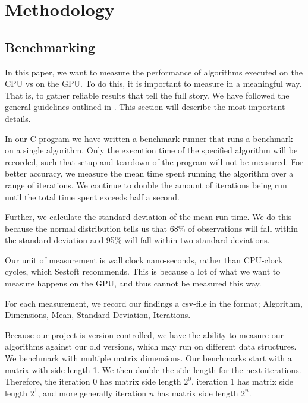 
\section{Methodology}
\label{sect:methodology}

\subsection{Benchmarking} \label{subsect:benchmark}
In this paper, we want to measure the performance of algorithms executed on the CPU vs on the GPU. To do this, it is important to measure in a meaningful way. That is, to gather reliable results that tell the full story. We have followed the general guidelines outlined in \cite[Sect. 3]{sestoft:benchmarks}. This section will describe the most important details. 

In our C-program we have written a benchmark runner that runs a benchmark on a single algorithm. Only the execution time of the specified algorithm will be recorded, such that setup and teardown of the program will not be measured. For better accuracy, we measure the mean time spent running the algorithm over a range of iterations. We continue to double the amount of iterations being run until the total time spent exceeds half a second.

Further, we calculate the standard deviation of the mean run time. We do this because the normal distribution tells us that 68\% of observations will fall within the standard deviation and 95\% will fall within two standard deviations.

Our unit of measurement is wall clock nano-seconds, rather than CPU-clock cycles, which Sestoft recommends. This is because a lot of what we want to measure happens on the GPU, and thus cannot be measured this way. 

For each measurement, we record our findings a csv-file in the format; Algorithm, Dimensions, Mean, Standard Deviation, Iterations. 

Because our project is version controlled, we have the ability to measure our algorithms against our old versions, which may run on different data structures.\\

\noindent We benchmark with multiple matrix dimensions. Our benchmarks start with a matrix with side length 1. We then double the side length for the next iterations. Therefore, the iteration 0 has matrix side length $2^0$, iteration 1 has matrix side length $2^1$, and more generally iteration $n$ has matrix side length $2^n$.

